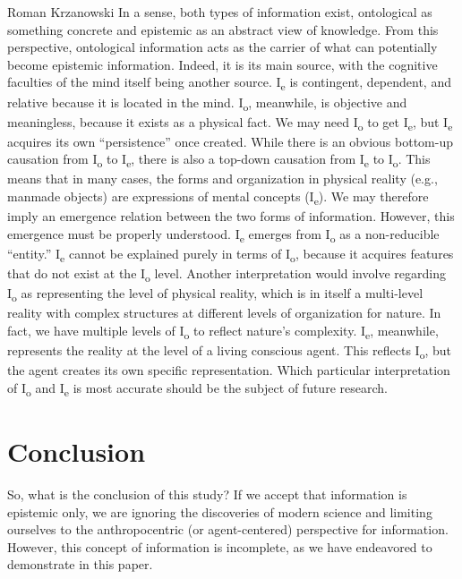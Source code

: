 \begin{artengenv}{Roman Krzanowski}
In a sense, both types of information exist, ontological as something concrete and epistemic as an abstract view of knowledge. From this perspective, ontological information acts as the carrier of what can potentially become epistemic information. Indeed, it is its main source, with the cognitive faculties of the mind itself being another source. I\textsubscript{e }is contingent, dependent, and relative because it is located in the mind. I\textsubscript{o}, meanwhile, is objective and meaningless, because it exists as a physical fact. We may need I\textsubscript{o} to get I\textsubscript{e}, but I\textsubscript{e} acquires its own ``persistence'' once created. While there is an obvious bottom-up causation from I\textsubscript{o }to I\textsubscript{e}, there is also a top-down causation from I\textsubscript{e }to I\textsubscript{o}. This means that in many cases, the forms and organization in physical reality (e.g., manmade objects) are expressions of mental concepts (I\textsubscript{e}). We may therefore imply an emergence relation between the two forms of information. However, this emergence must be properly understood. I\textsubscript{e} emerges from I\textsubscript{o} as a non-reducible ``entity.'' I\textsubscript{e} cannot be explained purely in terms of I\textsubscript{o}, because it acquires features that do not exist at the I\textsubscript{o} level. Another interpretation would involve regarding I\textsubscript{o }as representing the level of physical reality, which is in itself a multi-level reality with complex structures at different levels of organization for nature. In fact, we have multiple levels of I\textsubscript{o }to reflect nature's complexity. I\textsubscript{e}, meanwhile, represents the reality at the level of a living conscious agent. This reflects I\textsubscript{o}, but the agent creates its own specific representation. Which particular interpretation of I\textsubscript{o} and I\textsubscript{e} is most accurate should be the subject of future research.

\section{Conclusion}
So, what is the conclusion of this study? If we accept that information is epistemic only, we are ignoring the discoveries of modern science and limiting ourselves to the anthropocentric (or agent-centered) perspective for information. However, this concept of information is incomplete, as we have endeavored to demonstrate in this paper.


\end{artengenv}
